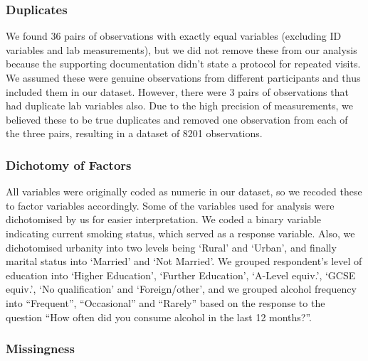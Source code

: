 \documentclass[
  11pt,
  twocolumn]{article}
\begin{document}
\hypertarget{duplicates}{%
\subsubsection{Duplicates}\label{duplicates}}

We found 36 pairs of observations with exactly equal variables
(excluding ID variables and lab measurements), but we did not remove
these from our analysis because the supporting documentation didn't
state a protocol for repeated visits. We assumed these were genuine
observations from different participants and thus included them in our
dataset. However, there were 3 pairs of observations that had duplicate
lab variables also. Due to the high precision of measurements, we
believed these to be true duplicates and removed one observation from
each of the three pairs, resulting in a dataset of 8201 observations.

\hypertarget{dichotomy-of-factors}{%
\subsubsection{Dichotomy of Factors}\label{dichotomy-of-factors}}

All variables were originally coded as numeric in our dataset, so we
recoded these to factor variables accordingly. Some of the variables
used for analysis were dichotomised by us for easier interpretation. We
coded a binary variable indicating current smoking status, which served
as a response variable. Also, we dichotomised urbanity into two levels
being `Rural' and `Urban', and finally marital status into `Married' and
`Not Married'. We grouped respondent's level of education into `Higher
Education', `Further Education', `A-Level equiv.', `GCSE equiv.', `No
qualification' and `Foreign/other', and we grouped alcohol frequency
into ``Frequent'', ``Occasional'' and ``Rarely'' based on the response
to the question ``How often did you consume alcohol in the last 12
months?''.

\hypertarget{missingness}{%
\subsubsection{Missingness}\label{missingness}}
\end{document}
